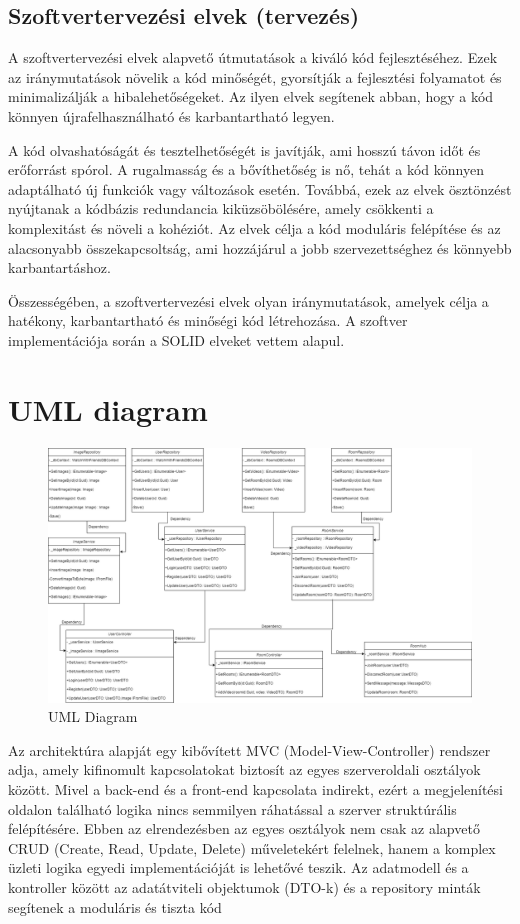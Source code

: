 \subsection*{Szoftvertervezési elvek (tervezés)}
A szoftvertervezési elvek alapvető útmutatások a kiváló kód fejlesztéséhez. Ezek az iránymutatások növelik a kód minőségét, gyorsítják a fejlesztési folyamatot és minimalizálják a hibalehetőségeket. Az ilyen elvek segítenek abban, hogy a kód könnyen újrafelhasználható és karbantartható legyen.

A kód olvashatóságát és tesztelhetőségét is javítják, ami hosszú távon időt és erőforrást spórol. A rugalmasság és a bővíthetőség is nő, tehát a kód könnyen adaptálható új funkciók vagy változások esetén. Továbbá, ezek az elvek ösztönzést nyújtanak a kódbázis redundancia kiküzsöbölésére, amely csökkenti a komplexitást és növeli a kohéziót. Az elvek célja a kód moduláris felépítése és az alacsonyabb összekapcsoltság, ami hozzájárul a jobb szervezettséghez és könnyebb karbantartáshoz.

Összességében, a szoftvertervezési elvek olyan iránymutatások, amelyek célja a hatékony, karbantartható és minőségi kód létrehozása.
A szoftver implementációja során a SOLID elveket vettem alapul.

\section*{UML diagram}

\begin{figure}[H]
    \centering
    \includegraphics[width=14.0truecm]{images/UML_Diagram.png}
    \caption{UML Diagram}
    \label{fig:uml_diagram}
\end{figure}

Az architektúra alapját egy kibővített MVC (Model-View-Controller) rendszer adja,
amely kifinomult kapcsolatokat biztosít az egyes szerveroldali osztályok között. Mivel a back-end és a front-end kapcsolata indirekt,
ezért a megjelenítési oldalon található logika nincs semmilyen ráhatással a szerver struktúrális felépítésére.
Ebben az elrendezésben az egyes osztályok nem csak az alapvető CRUD (Create,
Read, Update, Delete) műveletekért felelnek, hanem a komplex üzleti logika egyedi
implementációját is lehetővé teszik. Az adatmodell és a kontroller között az adatátviteli objektumok (DTO-k) és a repository minták segítenek a moduláris és tiszta kód

